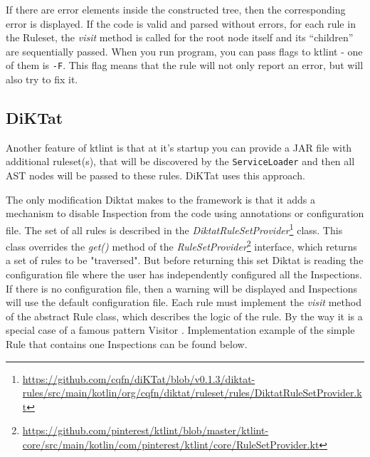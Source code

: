If there are error elements inside the constructed tree, then the corresponding error is displayed. If the code is valid and parsed without errors, for each rule in the Ruleset, the \textsl{visit} method is called for the root node itself and its “children” are sequentially passed.
When you run program, you can pass flags to ktlint - one of them is \texttt{-F}. This flag means that the rule will not only report an error, but will also try to fix it.

\subsection{DiKTat}

Another feature of ktlint is that at it's startup you can provide a JAR file with additional ruleset(s), that will be discovered by the \texttt{ServiceLoader} and then all AST nodes will be passed to these rules. DiKTat uses this approach.

The only modification Diktat makes to the framework is that it adds a mechanism to disable Inspection from the code using annotations or configuration file. The set of all rules is described in the \textsl{DiktatRuleSetProvider}\footnote{\url{https://github.com/cqfn/diKTat/blob/v0.1.3/diktat-rules/src/main/kotlin/org/cqfn/diktat/ruleset/rules/DiktatRuleSetProvider.kt}} class. This class overrides the \textsl{get()} method of the \textsl{RuleSetProvider}\footnote{\url{https://github.com/pinterest/ktlint/blob/master/ktlint-core/src/main/kotlin/com/pinterest/ktlint/core/RuleSetProvider.kt}} interface, which returns a set of rules to be "traversed". But before returning this set Diktat is reading the configuration file where the user has independently configured all the Inspections. If there is no configuration file, then a warning will be displayed and Inspections will use the default configuration file.
Each rule must implement the \textsl{visit} method of the abstract Rule class, which describes the logic of the rule. By the way it is a special case of a famous pattern Visitor \cite{ref:gang}. Implementation example of the simple Rule that contains one Inspections can be found below.

